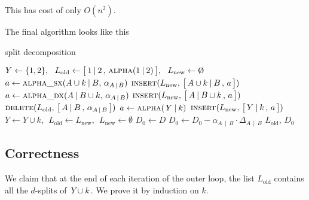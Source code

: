 \documentclass[./main.tex]{subfiles}
\begin{document}
This has cost of only $O(n^2)$.

\clearpage

The final algorithm looks like this\medskip

\begin{algorithm}
\caption{split decomposition}
\begin{algorithmic}[1]
        \State $Y \gets \{1,2\},\ \ L_\text{old} \gets \bigl[\, 1 \mathbin{|} 2 \,,\, \Call{alpha}{1 \mathbin{|} 2} \,\bigr],\ \ L_\text{new} \gets \emptyset$
                \State $a \gets \Call{alpha\_sx}{A \cup k \mathbin{|} B,\, \alpha_{A \,\mathbin{|}\, B}}$
                    \State $\Call{insert}{L_\text{new},\, \bigl[\, A \cup k \mathbin{|} B \,,\, a \,\bigr]}$
                \EndIf
                \State $a \gets \Call{alpha\_dx}{A \mathbin{|} B \cup k,\, \alpha_{A \,\mathbin{|}\, B}}$
                    \State $\Call{insert}{L_\text{new},\, \bigl[\, A \mathbin{|} B \cup k \,,\, a \,\bigr]}$
                \EndIf
                \State $\Call{delete}{L_\text{old},\, \bigl[\, A \mathbin{|} B \,,\, \alpha_{A \,\mathbin{|}\, B} \,\bigr]}$
            \EndFor
            \State $a \gets \Call{alpha}{\,Y \mathbin{|} k}$
                \State $\Call{insert}{L_\text{new},\, \bigl[\, Y \mathbin{|} k \,,\, a \,\bigr]}$
            \EndIf
            \State $Y \gets Y \cup k,\ \ L_\text{old} \gets L_\text{new},\ \ L_\text{new} \gets \emptyset$
        \EndFor
        \State $D_0 \gets D$
            \State $D_0 \gets D_0 - \alpha_{A \,\mathbin{|}\, B} \cdot \Delta_{A \,\mathbin{|}\, B}$
        \EndFor
        \State \Return $L_\text{old},\, D_0$
    \EndFunction
\end{algorithmic}
\end{algorithm}

\clearpage


\subsection*{Correctness}

We claim that at the end of each iteration of the outer loop, the list $L_\text{old}$ contains all the $d$-splits of $\, Y \cup k \,$. We prove it by induction on $k$.\bigskip
\end{document}
